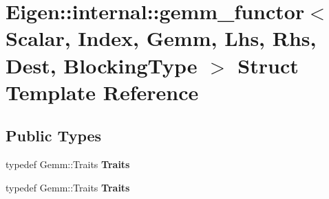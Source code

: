 \hypertarget{struct_eigen_1_1internal_1_1gemm__functor}{}\section{Eigen\+:\+:internal\+:\+:gemm\+\_\+functor$<$ Scalar, Index, Gemm, Lhs, Rhs, Dest, Blocking\+Type $>$ Struct Template Reference}
\label{struct_eigen_1_1internal_1_1gemm__functor}
\subsection*{Public Types}
\begin{DoxyCompactItemize}
\item 
\mbox{\label{struct_eigen_1_1internal_1_1gemm__functor_a5e2e68b3b5ffc8461b57a564dba32c50}} 
typedef Gemm\+::\+Traits {\bfseries Traits}
\item 
\mbox{\label{struct_eigen_1_1internal_1_1gemm__functor_a5e2e68b3b5ffc8461b57a564dba32c50}} 
typedef Gemm\+::\+Traits {\bfseries Traits}
\end{DoxyCompactItemize}
